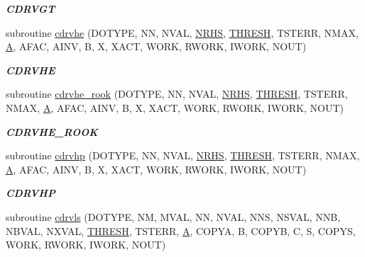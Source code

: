 \begin{DoxyCompactItemize}
\begin{DoxyCompactList}\small\item\em {\bfseries C\+D\+R\+V\+G\+T} \end{DoxyCompactList}\item 
subroutine \hyperlink{group__complex__lin_ga634a43f75febed109db6fd2b4b4267ff}{cdrvhe} (D\+O\+T\+Y\+P\+E, N\+N, N\+V\+A\+L, \hyperlink{example__user_8c_aa0138da002ce2a90360df2f521eb3198}{N\+R\+H\+S}, \hyperlink{zlaqgs_8c_a0656018abfc9fa2821827415f5d5ea57}{T\+H\+R\+E\+S\+H}, T\+S\+T\+E\+R\+R, N\+M\+A\+X, \hyperlink{classA}{A}, A\+F\+A\+C, A\+I\+N\+V, B, X, X\+A\+C\+T, W\+O\+R\+K, R\+W\+O\+R\+K, I\+W\+O\+R\+K, N\+O\+U\+T)
\begin{DoxyCompactList}\small\item\em {\bfseries C\+D\+R\+V\+H\+E} \end{DoxyCompactList}\item 
subroutine \hyperlink{group__complex__lin_gac81185f93ee75e131b1ea287c6e93536}{cdrvhe\+\_\+rook} (D\+O\+T\+Y\+P\+E, N\+N, N\+V\+A\+L, \hyperlink{example__user_8c_aa0138da002ce2a90360df2f521eb3198}{N\+R\+H\+S}, \hyperlink{zlaqgs_8c_a0656018abfc9fa2821827415f5d5ea57}{T\+H\+R\+E\+S\+H}, T\+S\+T\+E\+R\+R, N\+M\+A\+X, \hyperlink{classA}{A}, A\+F\+A\+C, A\+I\+N\+V, B, X, X\+A\+C\+T, W\+O\+R\+K, R\+W\+O\+R\+K, I\+W\+O\+R\+K, N\+O\+U\+T)
\begin{DoxyCompactList}\small\item\em {\bfseries C\+D\+R\+V\+H\+E\+\_\+\+R\+O\+O\+K} \end{DoxyCompactList}\item 
subroutine \hyperlink{group__complex__lin_ga17da83da253c7dd967688344541f3ec5}{cdrvhp} (D\+O\+T\+Y\+P\+E, N\+N, N\+V\+A\+L, \hyperlink{example__user_8c_aa0138da002ce2a90360df2f521eb3198}{N\+R\+H\+S}, \hyperlink{zlaqgs_8c_a0656018abfc9fa2821827415f5d5ea57}{T\+H\+R\+E\+S\+H}, T\+S\+T\+E\+R\+R, N\+M\+A\+X, \hyperlink{classA}{A}, A\+F\+A\+C, A\+I\+N\+V, B, X, X\+A\+C\+T, W\+O\+R\+K, R\+W\+O\+R\+K, I\+W\+O\+R\+K, N\+O\+U\+T)
\begin{DoxyCompactList}\small\item\em {\bfseries C\+D\+R\+V\+H\+P} \end{DoxyCompactList}\item 
subroutine \hyperlink{group__complex__lin_ga1db08d6ebd43c214c9ee2201d9410519}{cdrvls} (D\+O\+T\+Y\+P\+E, N\+M, M\+V\+A\+L, N\+N, N\+V\+A\+L, N\+N\+S, N\+S\+V\+A\+L, N\+N\+B, N\+B\+V\+A\+L, N\+X\+V\+A\+L, \hyperlink{zlaqgs_8c_a0656018abfc9fa2821827415f5d5ea57}{T\+H\+R\+E\+S\+H}, T\+S\+T\+E\+R\+R, \hyperlink{classA}{A}, C\+O\+P\+Y\+A, B, C\+O\+P\+Y\+B, C, S, C\+O\+P\+Y\+S, W\+O\+R\+K, R\+W\+O\+R\+K, I\+W\+O\+R\+K, N\+O\+U\+T)

\end{DoxyCompactItemize}
